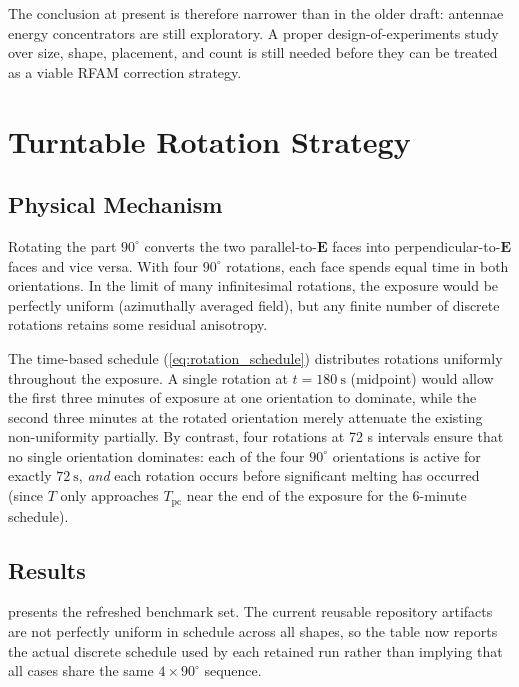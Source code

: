 \documentclass[5p,times]{elsarticle}
\newcommand{\Tpc}{T_{\mathrm{pc}}}
\newcommand{\vect}[1]{\boldsymbol{#1}}
\begin{document}
The conclusion at present is therefore narrower than in the older
draft: antennae energy concentrators are still exploratory.  A proper
design-of-experiments study over size, shape, placement, and count is
still needed before they can be treated as a viable RFAM correction
strategy.

\FloatBarrier
\section{Turntable Rotation Strategy}
\label{sec:results_turntable}

\subsection{Physical Mechanism}

Rotating the part $90^\circ$ converts the two parallel-to-$\vect{E}$
faces into perpendicular-to-$\vect{E}$ faces and vice versa.  With
four $90^\circ$ rotations, each face spends equal time in both
orientations.  In the limit of many infinitesimal rotations, the
exposure would be perfectly uniform (azimuthally averaged field), but
any finite number of discrete rotations retains some residual anisotropy.

The time-based schedule (\cref{eq:rotation_schedule}) distributes
rotations uniformly throughout the exposure.  A single rotation at
$t = \SI{180}{\second}$ (midpoint) would allow the first three minutes
of exposure at one orientation to dominate, while the second three
minutes at the rotated orientation merely attenuate the existing
non-uniformity partially.  By contrast, four rotations at 72 s
intervals ensure that no single orientation dominates: each of the
four $90^\circ$ orientations is active for exactly $\SI{72}{\second}$,
\textit{and} each rotation occurs before significant melting has
occurred (since $T$ only approaches $\Tpc$ near the end of the
exposure for the 6-minute schedule).

\subsection{Results}

 presents the refreshed benchmark set.
The current reusable repository artifacts are not perfectly uniform in
schedule across all shapes, so the table now reports the actual
discrete schedule used by each retained run rather than implying that
all cases share the same $4\times 90^\circ$ sequence.
\end{document}
